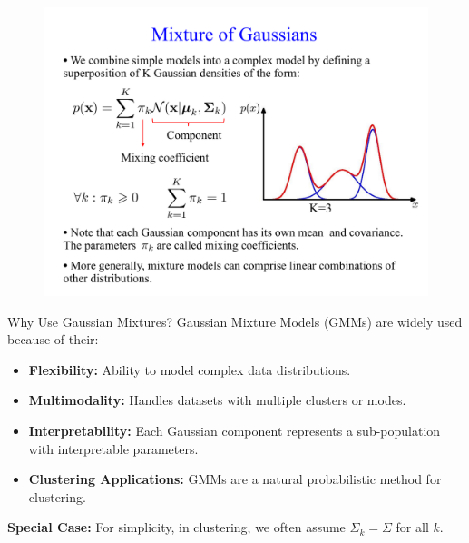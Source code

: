 \documentclass[11pt,handout,aspectratio=169]{beamer}
\begin{document}
\begin{frame}{}
\begin{figure}
\includegraphics[page=2,width=4.8in,trim={0 0 0 3cm},clip]{pics/raw.pdf}
\end{figure}
\end{frame}

\begin{frame}{Why Use Gaussian Mixtures?}
Gaussian Mixture Models (GMMs) are widely used because of their:
\begin{itemize}
    \item \textbf{Flexibility:} Ability to model complex data distributions.
    \item \textbf{Multimodality:} Handles datasets with multiple clusters or modes.
    \item \textbf{Interpretability:} Each Gaussian component represents a sub-population with interpretable parameters.
    \item \textbf{Clustering Applications:} GMMs are a natural probabilistic method for clustering.
\end{itemize}

\textbf{Special Case:}
For simplicity, in clustering, we often assume \( \Sigma_k = \Sigma \) for all \( k \).
\end{frame}
\end{document}
